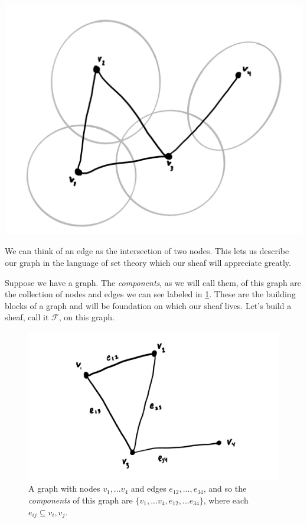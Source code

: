 \documentclass{tufte-handout}
\newcommand{\F}{\mathcal{F}}
\begin{document}
\begin{marginfigure}%
  \includegraphics[width=\linewidth]{cover.png}
  \caption{We can think of an edge as the intersection of two nodes. This lets us describe our graph in the language of set theory which our sheaf will appreciate greatly.}
  \label{fig:setedge}
\end{marginfigure}

Suppose we have a graph. The \emph{components}, as we will call them, of this graph are the collection of nodes and edges we can see labeled in \cref{fig:graph}. These are the building blocks of a graph and will be foundation on which our sheaf lives. Let's build a sheaf, call it $\F$, on this graph.

\begin{figure}[h!]
    \centering
    \includegraphics{graph.png}
    \caption{A graph with nodes $v_1,...v_4$ and edges $e_{12},...,e_{34}$, and so the \emph{components} of this graph are $\{v_1,...v_4,e_{12},...e_{34}\}$, where each $e_{ij} \subseteq v_i,v_j$.}
    \label{fig:graph}
\end{figure}
\end{document}
